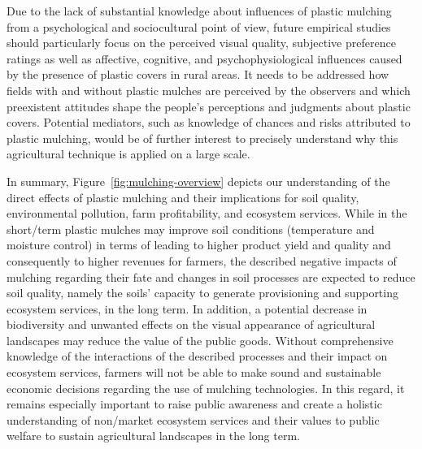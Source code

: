 Due to the lack of substantial knowledge about influences of plastic mulching from a psychological and sociocultural point of view, future empirical studies should particularly focus on the perceived visual quality, subjective preference ratings as well as affective, cognitive, and psychophysiological influences caused by the presence of plastic covers in rural areas. It needs to be addressed how fields with and without plastic mulches are perceived by the observers and which preexistent attitudes shape the people's perceptions and judgments about plastic covers. Potential mediators, such as knowledge of chances and risks attributed to plastic mulching, would be of further interest to precisely understand why this agricultural technique is applied on a large scale.

In summary, Figure~\ref{fig:mulching-overview} depicts our understanding of the direct effects of plastic mulching and their implications for soil quality, environmental pollution, farm profitability, and ecosystem services. While in the short\-/term plastic mulches may improve soil conditions (temperature and moisture control) in terms of leading to higher product yield and quality and consequently to higher revenues for farmers, the described negative impacts of mulching regarding their fate and changes in soil processes are expected to reduce soil quality, namely the soils' capacity to generate provisioning and supporting ecosystem services, in the long term. In addition, a potential decrease in biodiversity and unwanted effects on the visual appearance of agricultural landscapes may reduce the value of the public goods. Without comprehensive knowledge of the interactions of the described processes and their impact on ecosystem services, farmers will not be able to make sound and sustainable economic decisions regarding the use of mulching technologies. In this regard, it remains especially important to raise public awareness and create a holistic understanding of non\-/market ecosystem services and their values to public welfare to sustain agricultural landscapes in the long term.

